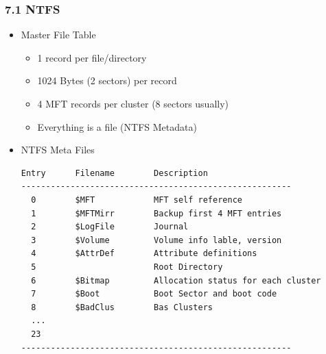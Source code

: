\begin{frame}[fragile]
  \frametitle{7.1 NTFS}
    \begin{itemize}
    \item Master File Table
        \begin{itemize}
	    \item 1 record per file/directory
	    \item 1024 Bytes (2 sectors) per record
	    \item 4 MFT records per cluster (8 sectors usually)
	    \item Everything is a file (NTFS Metadata)
        \end{itemize}
	\item NTFS Meta Files
  \begin{lstlisting}[basicstyle=\tiny]
Entry      Filename        Description
-------------------------------------------------------
  0        $MFT            MFT self reference
  1        $MFTMirr        Backup first 4 MFT entries
  2        $LogFile        Journal
  3        $Volume         Volume info lable, version
  4        $AttrDef        Attribute definitions
  5                        Root Directory
  6        $Bitmap         Allocation status for each cluster
  7        $Boot           Boot Sector and boot code
  8        $BadClus        Bas Clusters
  ...
  23
-------------------------------------------------------
  \end{lstlisting}
    \end{itemize}
\end{frame}


